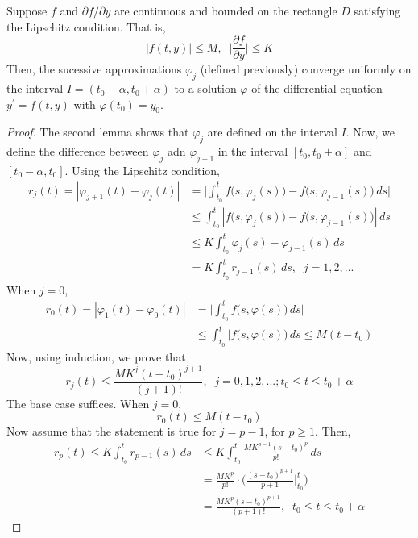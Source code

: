 \documentclass{article}
\newcounter{theorem}[section]
\begin{document}
    \begin{theorem}
      \label{thm:picard-lindelof-existence-and-uniqueness}
    Suppose $f$ and $\partial f/\partial y$ are continuous and bounded on the rectangle $D$ satisfying the Lipschitz condition. That is, 
    \begin{equation}
      |f(t, y)| \leq M, \;\; \Big| \frac{\partial f}{\partial y} \Big| \leq K
    \end{equation}
    Then, the sucessive approximations $\varphi_j$ (defined previously) converge uniformly on the interval $I = (t_0 - \alpha, t_0 + \alpha)$ to a solution $\varphi$ of the differential equation $y^\prime = f(t, y)$ with $\varphi(t_0) = y_0$. 
    \end{theorem}
    \begin{proof}
    The second lemma shows that $\varphi_j$ are defined on the interval $I$. Now, we define the difference between $\varphi_j$ adn $\varphi_{j+1}$ in the interval $[t_0, t_0 + \alpha]$ and $[t_0 - \alpha, t_0]$. Using the Lipschitz condition, 
    \begin{align*}
        r_j (t) = |\varphi_{j+1} (t) - \varphi_j (t)| & = \bigg| \int_{t_0}^t f\big(s, \varphi_j (s)\big) - f\big(s, \varphi_{j-1} (s) \big) \,ds\bigg| \\
        & \leq \int_{t_0}^t |f\big(s, \varphi_j (s)\big) - f\big( s, \varphi_{j-1} (s)\big)|\,ds \\
        & \leq K \int_{t_0}^t \varphi_j (s) - \varphi_{j-1} (s) \,ds \\
        & = K \int_{t_0}^t r_{j-1} (s) \,ds, \;\; j = 1, 2, ...
    \end{align*}
    When $j=0$, 
    \begin{align*}
        r_0 (t) = |\varphi_1 (t) - \varphi_0 (t)| & = \bigg| \int_{t_0}^t f \big(s, \varphi(s)\big) \,ds \bigg| \\
        & \leq \int_{t_0}^t |f\big(s, \varphi(s)\big)\,ds \leq M (t - t_0) 
    \end{align*}
    Now, using induction, we prove that 
    \begin{equation}
      r_j (t) \leq \frac{M K^j (t-t_0)^{j+1}}{(j+1)!}, \;\; j = 0, 1, 2, ...; t_0 \leq t \leq t_0 + \alpha
    \end{equation}
    The base case suffices. When $j=0$, 
    \begin{equation}
      r_0 (t) \leq M (t-t_0)
    \end{equation}
    Now assume that the statement is true for $j=p-1$, for $p \geq 1$. Then, 
    \begin{align*}
        r_p (t) \leq K \int_{t_0}^t r_{p-1} (s) \, ds & \leq K \int_{t_0}^t \frac{M K^{p-1} (s - t_0)^p}{p!} \,ds \\
        & = \frac{M K^p}{p!} \cdot \bigg( \frac{(s-t_0)^{p+1}}{p+1} \bigg|_{t_0}^t \bigg) \\
        & = \frac{M K^p (s - t_0)^{p+1}}{(p+1)!}, \;\; t_0 \leq t \leq t_0 + \alpha
    \end{align*}
    \end{proof}
\end{document}
